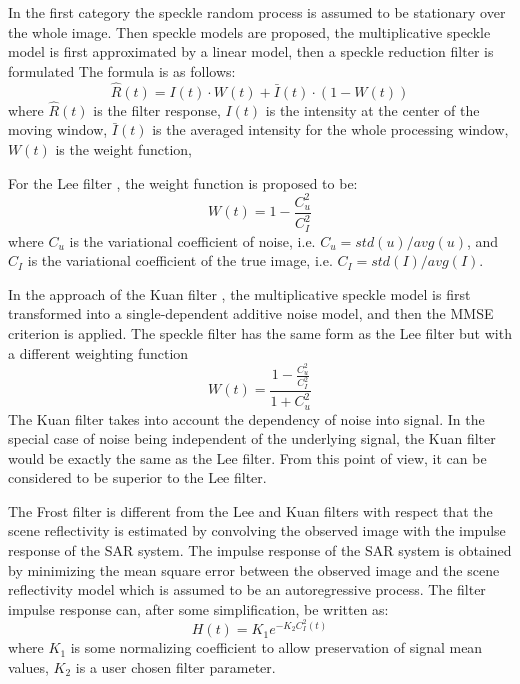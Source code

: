 In the first category the speckle random process is assumed to be stationary over the whole image. 
Then speckle models are proposed, the multiplicative speckle model is first approximated by a linear model, then a speckle reduction filter is formulated
The formula is as follows: 
\begin{equation}
\hat{R}(t) = I(t) \cdot W(t) + \bar{I}(t) \cdot (1 - W(t)) 
\end{equation}
where
	$\hat{R}(t)$ is the filter response,
	$I(t)$ is the intensity at the center of the moving window,
	$\bar{I}(t)$ is the averaged intensity for the whole processing window,
	$W(t)$ is the weight function,

For the Lee filter \cite{Lee_PAMI_1980}, the weight function is proposed to be:
\begin{equation}
W(t) = 1 - \frac{C_u^2}{C_I^2} 
\end{equation}
where
	$C_u$ is the variational coefficient of noise, i.e. $C_u=std(u)/avg(u)$, and
	$C_I$ is the variational coefficient of the true image, i.e. $C_I=std(I)/avg(I)$.

In the approach of the Kuan filter \cite{Kuan_1985_PAMI}, the multiplicative speckle model is first transformed into a single-dependent additive noise model, and then the MMSE criterion is applied. 
The speckle filter has the same form as the Lee filter but with a different weighting function 
\begin{equation}
W(t) = \frac{1 - \frac{C_u^2}{C_I^2} }{1+ C_u^2} 
\end{equation} 
The Kuan filter takes into account the dependency of noise into signal. 
In the special case of noise being independent of the underlying signal, the Kuan filter would be exactly the same as the Lee filter.
From this point of view, it can be considered to be superior to the Lee filter.

The Frost filter \cite{Frost_PAMI_1982} is different from the Lee and Kuan filters with respect that the scene reflectivity is estimated by convolving the observed image with the impulse response of the SAR system. 
The impulse response of the SAR system is obtained by minimizing the mean square error between the observed image and the scene reflectivity model which is assumed to be an autoregressive process. 
The filter impulse response can, after some simplification, be written as:
\begin{equation}
H(t) = K_1 e^{-K_2 C_I^2(t)}
\end{equation}
where
	$K_1$ is some normalizing coefficient to allow preservation of signal mean values,
	$K_2$ is a user chosen filter parameter.


